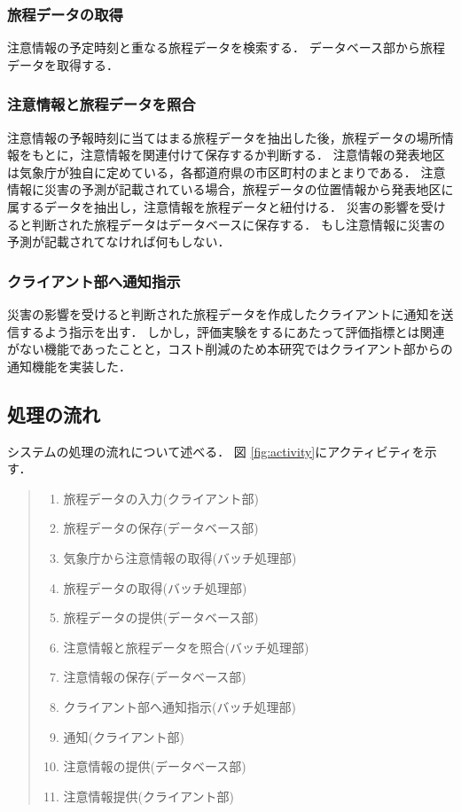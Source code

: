 \subsubsection{旅程データの取得}
注意情報の予定時刻と重なる旅程データを検索する．
データベース部から旅程データを取得する．

\subsubsection{注意情報と旅程データを照合}
注意情報の予報時刻に当てはまる旅程データを抽出した後，旅程データの場所情報をもとに，注意情報を関連付けて保存するか判断する．
注意情報の発表地区は気象庁が独自に定めている，各都道府県の市区町村のまとまりである．
注意情報に災害の予測が記載されている場合，旅程データの位置情報から発表地区に属するデータを抽出し，注意情報を旅程データと紐付ける．
災害の影響を受けると判断された旅程データはデータベースに保存する．
もし注意情報に災害の予測が記載されてなければ何もしない．


\subsubsection{クライアント部へ通知指示}
災害の影響を受けると判断された旅程データを作成したクライアントに通知を送信するよう指示を出す．
しかし，評価実験をするにあたって評価指標とは関連がない機能であったことと，コスト削減のため本研究ではクライアント部からの通知機能を実装した．

\subsection{処理の流れ}
システムの処理の流れについて述べる．
図 \ref{fig:activity}にアクティビティを示す．

\begin{quote}
  \begin{enumerate}
    \item 旅程データの入力(クライアント部)
    \item 旅程データの保存(データベース部)
    \item 気象庁から注意情報の取得(バッチ処理部)
    \item 旅程データの取得(バッチ処理部)
    \item 旅程データの提供(データベース部)
    \item 注意情報と旅程データを照合(バッチ処理部)
    \item 注意情報の保存(データベース部)
    \item クライアント部へ通知指示(バッチ処理部)
    \item 通知(クライアント部)
    \item 注意情報の提供(データベース部)
    \item 注意情報提供(クライアント部)
  \end{enumerate}
\end{quote}

